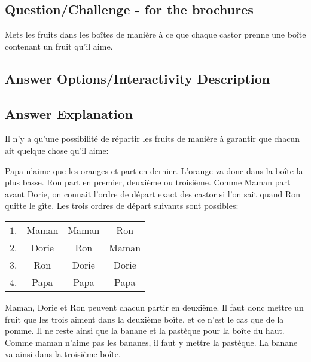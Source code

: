 \documentclass[a4paper,11pt]{report}
\newcommand{\taskGraphicsFolder}{..}
\begin{document}
{\em


\subsection*{Question/Challenge - for the brochures}

Mets les fruits dans les boîtes de manière à ce que chaque castor prenne une boîte contenant un fruit qu’il aime.

{\centering%
\par}

}

\begingroup
\renewcommand{\arraystretch}{1.5}
\subsection*{Answer Options/Interactivity Description}



\endgroup

\subsection*{Answer Explanation}

Il n’y a qu’une possibilité de répartir les fruits de manière à garantir que chacun ait quelque chose qu’il aime:

{\centering%
\par}

Papa n’aime que les oranges et part en dernier. L’orange va donc dans la boîte la plus basse.
Ron part en premier, deuxième ou troisième. Comme Maman part avant Dorie, on connait l’ordre de départ exact des castor si l’on sait quand Ron quitte le gîte. Les trois ordres de départ suivants sont possibles:

{\centering%
\begin{tabular}{ @{} c c c c @{} }
  $1$. & Maman & Maman & Ron \\ 
  $2$. & Dorie & Ron & Maman \\ 
  $3$. & Ron & Dorie & Dorie \\ 
  $4$. & Papa & Papa & Papa
\end{tabular}

\par}

Maman, Dorie et Ron peuvent chacun partir en deuxième. Il faut donc mettre un fruit que les trois aiment dans la deuxième boîte, et ce n’est le cas que de la pomme. Il ne reste ainsi que la banane et la pastèque pour la boîte du haut. Comme maman n’aime pas les bananes, il faut y mettre la pastèque. La banane va ainsi dans la troisième boîte.
\end{document}
